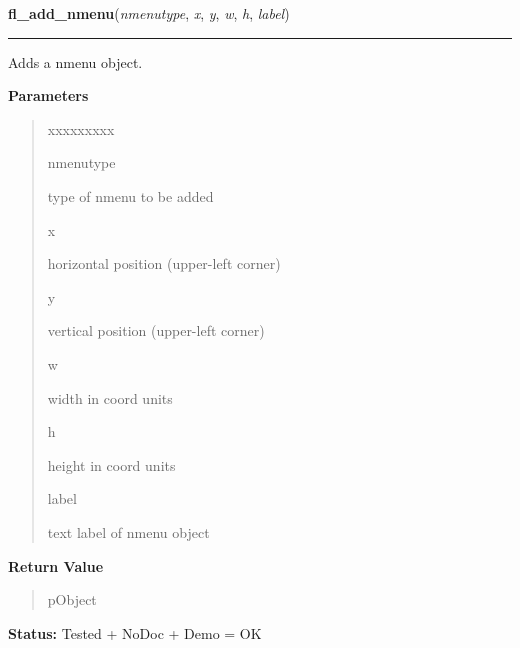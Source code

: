 \hspace{.8\funcindent}\begin{boxedminipage}{\funcwidth}

    \raggedright \textbf{fl\_add\_nmenu}(\textit{nmenutype}, \textit{x}, \textit{y}, \textit{w}, \textit{h}, \textit{label})

    \vspace{-1.5ex}

    \rule{\textwidth}{0.5\fboxrule}
\setlength{\parskip}{2ex}
    Adds a nmenu object.

\setlength{\parskip}{1ex}
      \textbf{Parameters}
      \vspace{-1ex}

      \begin{quote}
        \begin{Ventry}{xxxxxxxxx}

          \item[nmenutype]

          type of nmenu to be added

          \item[x]

          horizontal position (upper-left corner)

          \item[y]

          vertical position (upper-left corner)

          \item[w]

          width in coord units

          \item[h]

          height in coord units

          \item[label]

          text label of nmenu object

        \end{Ventry}

      \end{quote}

      \textbf{Return Value}
    \vspace{-1ex}

      \begin{quote}
      pObject

      \end{quote}

\textbf{Status:} Tested + NoDoc + Demo = OK



    \end{boxedminipage}

